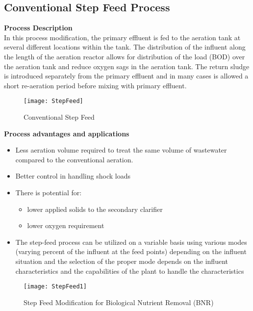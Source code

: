 \subsection{Conventional Step Feed Process}
\noindent \textbf{Process Description}\\
\noindent In this process modification, the primary effluent is fed to the aeration tank at several different locations within the tank.  The distribution of the influent along the length of the aeration reactor allows for distribution of the load (BOD) over the aeration tank and reduce oxygen sags in the aeration tank.  The return sludge is introduced separately from the primary effluent and in many cases is allowed a short re-aeration period  before mixing with primary effluent.\\

\begin{figure}[h!]
\begin{center}
\texttt{[image: StepFeed]}\\
\caption{Conventional Step Feed}
\end{center}
\end{figure}

\noindent \textbf{Process advantages and applications}
\begin{itemize}
\item Less aeration volume required to treat the same volume of wastewater compared to the conventional aeration.

\item Better control in handling shock loads

\item There is potential for:
\begin{itemize}
\item lower applied solids to the secondary clarifier
\item lower oxygen requirement
\end{itemize}
\item The step-feed process can be utilized on a variable basis using various modes (varying percent of the influent at the feed points) depending on the influent situation and the selection of the proper mode depends on the influent characteristics and the capabilities of the plant to handle the characteristics

\end{itemize}

\begin{figure}[bth!]
\begin{center}
\texttt{[image: StepFeed1]}\\
\caption{Step Feed Modification for Biological Nutrient Removal (BNR)}
\end{center}
\end{figure}



